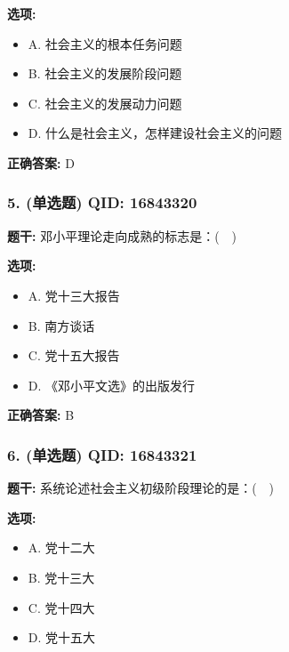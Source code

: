\documentclass[12pt,UTF8]{ctexart}
\begin{document}
\textbf{选项:}
\begin{itemize}[leftmargin=*]

  \item A. 社会主义的根本任务问题

  \item B. 社会主义的发展阶段问题

  \item C. 社会主义的发展动力问题

  \item D. 什么是社会主义，怎样建设社会主义的问题

\end{itemize}

\textbf{正确答案:}
D

\vspace{0.3em}\hrulefill\vspace{0.7em}

\subsubsection*{5. (单选题) \small QID: 16843320}

\textbf{题干:}
邓小平理论走向成熟的标志是：(  )

\textbf{选项:}
\begin{itemize}[leftmargin=*]

  \item A. 党十三大报告

  \item B. 南方谈话

  \item C. 党十五大报告

  \item D. 《邓小平文选》的出版发行

\end{itemize}

\textbf{正确答案:}
B

\vspace{0.3em}\hrulefill\vspace{0.7em}

\subsubsection*{6. (单选题) \small QID: 16843321}

\textbf{题干:}
系统论述社会主义初级阶段理论的是：(  )

\textbf{选项:}
\begin{itemize}[leftmargin=*]

  \item A. 党十二大

  \item B. 党十三大

  \item C. 党十四大

  \item D. 党十五大

\end{itemize}
\end{document}
